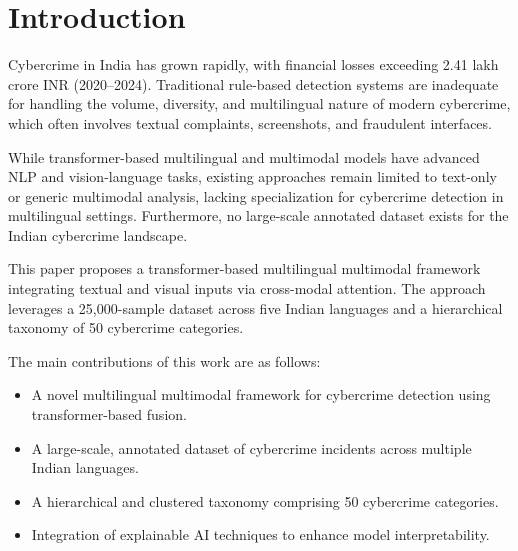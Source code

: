 \section{Introduction}

Cybercrime in India has grown rapidly, with financial losses exceeding 2.41 lakh crore INR (2020--2024). Traditional rule-based detection systems are inadequate for handling the volume, diversity, and multilingual nature of modern cybercrime, which often involves textual complaints, screenshots, and fraudulent interfaces.

While transformer-based multilingual and multimodal models have advanced NLP and vision-language tasks, existing approaches remain limited to text-only or generic multimodal analysis, lacking specialization for cybercrime detection in multilingual settings. Furthermore, no large-scale annotated dataset exists for the Indian cybercrime landscape.

This paper proposes a transformer-based multilingual multimodal framework integrating textual and visual inputs via cross-modal attention. The approach leverages a 25,000-sample dataset across five Indian languages and a hierarchical taxonomy of 50 cybercrime categories.

The main contributions of this work are as follows:
\begin{itemize}
    \item A novel multilingual multimodal framework for cybercrime detection using transformer-based fusion.
    \item A large-scale, annotated dataset of cybercrime incidents across multiple Indian languages.
    \item A hierarchical and clustered taxonomy comprising 50 cybercrime categories.
    \item Integration of explainable AI techniques to enhance model interpretability.
\end{itemize}